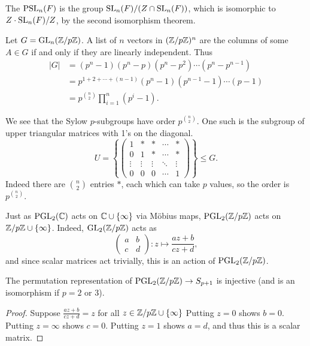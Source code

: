 \documentclass[a4paper]{scrartcl}
\begin{document}
\begin{definition}
	The  $\operatorname{PSL}_n(F)$ is the group $\operatorname{SL}_n(F) / (Z \cap  \operatorname{SL}_n(F))$, which is isomorphic to $Z\cdot \operatorname{SL}_n(F) / Z$, by the second isomorphism theorem.
\end{definition}

\begin{example}
	Let $G = \operatorname{GL}_n(\mathbb{Z}/p\mathbb{Z})$. A list of $n$ vectors in $(\mathbb{Z}/p\mathbb{Z})^n$ are the columns of some $A \in G$ if and only if they are linearly independent.
	Thus
	\begin{align*}
		|G| &= (p^n - 1)(p^n - p)(p^n - p^2) \cdots (p^n - p^{n - 1}) \\
		&= p^{1 + 2 + \cdots + (n - 1)}(p^n - 1)(p^{n - 1} - 1) \cdots (p - 1) \\
		&= p^{\binom{n}{2}} \prod_{i = 1}^n (p^i - 1).
	\end{align*}

	We see that the Sylow $p$-subgroups have order $p^{\binom{n}{2}}$. One such is the subgroup of upper triangular matrices with 1's on the diagonal.
	$$
	U = \left\{\begin{pmatrix}
		1 & * & * & \cdots & * \\
		0 & 1 & * & \cdots & * \\
		\vdots  &\vdots   & \vdots & \ddots &\vdots \\
		0 & 0 & 0 & \cdots & 1
	\end{pmatrix}\right\} \leq G.
	$$
	Indeed there are $\binom{n}{2}$ entries $*$, each which can take $p$ values, so the order is $p^{\binom{n}{2}}$.
\end{example}

Just as $\operatorname{PGL}_2(\mathbb{C})$ acts on $\mathbb{C} \cup \{\infty\}$ via Möbius maps, $\operatorname{PGL}_2(\mathbb{Z}/p\mathbb{Z})$ acts on $\mathbb{Z}/p\mathbb{Z} \cup \{\infty\}$.
Indeed, $\operatorname{GL}_2(\mathbb{Z}/p\mathbb{Z})$ acts as
$$
\begin{pmatrix}
	a & b\\
	c & d
\end{pmatrix}: z \longmapsto \frac{az + b}{cz + d},
$$
and since scalar matrices act trivially, this is an action of $\operatorname{PGL}_2(\mathbb{Z}/p\mathbb{Z})$.

\begin{lemma}
	The permutation representation of $\operatorname{PGL}_2(\mathbb{Z}/p\mathbb{Z}) \rightarrow S_{p + 1}$ is injective (and is an isomorphism if $p = 2$ or 3).
\end{lemma}
\begin{proof}
	Suppose $\frac{az + b}{cz + d} = z$ for all $z \in \mathbb{Z}/p\mathbb{Z} \cup \{\infty\}$ Putting $z = 0$ shows $b = 0$. Putting $z = \infty$ shows $c = 0$. Putting $z = 1$ shows $a = d$, and thus this is a scalar matrix. 
\end{proof}
\end{document}
